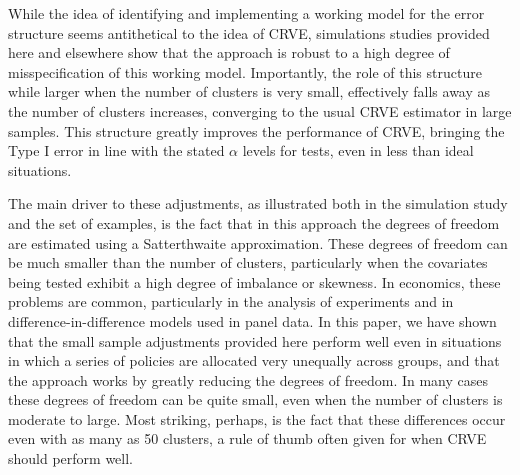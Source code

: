 \documentclass[12pt]{article}\usepackage[]{graphicx}\usepackage[]{color}
\begin{document}
While the idea of identifying and implementing a working model for the error structure seems antithetical to the idea of CRVE, simulations studies provided here and elsewhere show that the approach is robust to a high degree of misspecification of this working model.
Importantly, the role of this structure while larger when the number of clusters is very small, effectively falls away as the number of clusters increases, converging to the usual CRVE estimator in large samples.
This structure greatly improves the performance of CRVE, bringing the Type I error in line with the stated $\alpha$ levels for tests, even in less than ideal situations.

The main driver to these adjustments, as illustrated both in the simulation study and the set of examples, is the fact that in this approach the degrees of freedom are estimated using a Satterthwaite approximation.
These degrees of freedom can be much smaller than the number of clusters, particularly when the covariates being tested exhibit a high degree of imbalance or skewness.
In economics, these problems are common, particularly in the analysis of experiments and in difference-in-difference models used in panel data. 
In this paper, we have shown that the small sample adjustments provided here perform well even in situations in which a series of policies are allocated very unequally across groups, and that the approach works by greatly reducing the degrees of freedom.
In many cases these degrees of freedom can be quite small, even when the number of clusters is moderate to large.
Most striking, perhaps, is the fact that these differences occur even with as many as 50 clusters, a rule of thumb often given for when CRVE should perform well.




\end{document}
